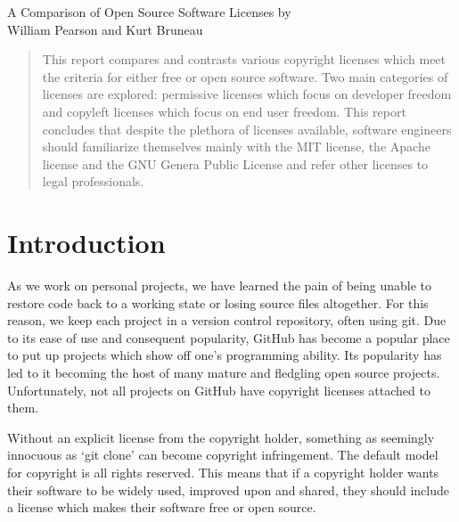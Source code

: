 \documentclass[12pt,letterpaper]{article}
\begin{document}
\thispagestyle{empty}

\begin{titlepage}
\vspace*{1.5in}
\begin{center}
  \huge A Comparison of Open Source Software Licenses
  \vskip1.5in
  \large by \\
  \large William Pearson and Kurt Bruneau \\
\end{center}
\end{titlepage}


\tableofcontents
\listoffigures
\newpage

\begin{abstract}
This report compares and contrasts various copyright licenses which meet the criteria for either free or open source software. Two main categories of licenses are explored: permissive licenses which focus on developer freedom and copyleft licenses which focus on end user freedom. This report concludes that despite the plethora of licenses available, software engineers should familiarize themselves mainly with the MIT license, the Apache license and the GNU Genera Public License and refer other licenses to legal professionals.
\end{abstract}
\newpage
\thispagestyle{empty}
\setcounter{page}{1}

\section{Introduction}

As we work on personal projects, we have learned the pain of being unable to restore code back to a working state or losing source files altogether. For this reason, we keep each project in a version control repository, often using git. Due to its ease of use and consequent popularity, GitHub has become a popular place to put up projects which show off one's programming ability. Its popularity has led to it becoming the host of many mature and fledgling open source projects. Unfortunately, not all projects on GitHub have copyright licenses attached to them.

Without an explicit license from the copyright holder, something as seemingly innocuous as `git clone' can become copyright infringement. The default model for copyright is all rights reserved. This means that if a copyright holder wants their software to be widely used, improved upon and shared, they should include a license which makes their software free or open source.\cite{nolicense}
\end{document}
